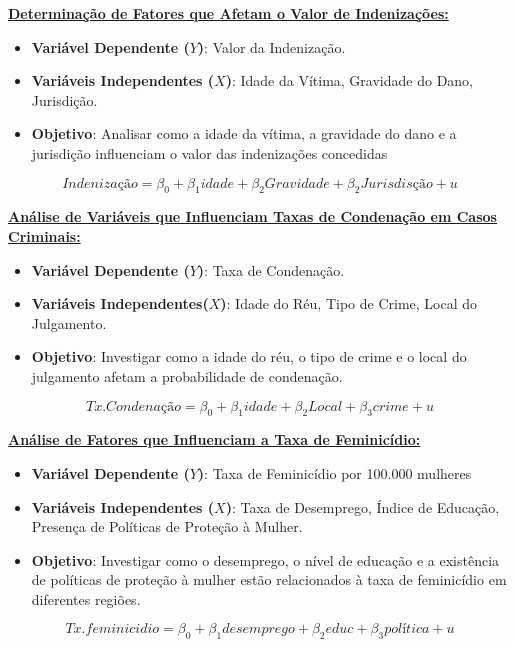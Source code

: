 \documentclass[
  letterpaper,
  DIV=11,
  numbers=noendperiod]{scrreprt}
\providecommand{\tightlist}{%
  \setlength{\itemsep}{0pt}\setlength{\parskip}{0pt}}
\begin{document}
\ul{\textbf{Determinação de Fatores que Afetam o Valor de
Indenizações:}}

\begin{itemize}
\tightlist
\item
  \textbf{Variável Dependente (\(Y\))}: Valor da Indenização.
\item
  \textbf{Variáveis Independentes (\(X\))}: Idade da Vítima, Gravidade
  do Dano, Jurisdição.
\item
  \textbf{Objetivo}: Analisar como a idade da vítima, a gravidade do
  dano e a jurisdição influenciam o valor das indenizações concedidas
\end{itemize}

\[Indenização = \beta_0 + \beta_1 idade+ \beta_2 Gravidade + \beta_2 Jurisdisção + u\]

\ul{\textbf{Análise de Variáveis que Influenciam Taxas de Condenação em
Casos Criminais:}}

\begin{itemize}
\tightlist
\item
  \textbf{Variável Dependente (\(Y\))}: Taxa de Condenação.
\item
  \textbf{Variáveis Independentes(\(X\))}: Idade do Réu, Tipo de Crime,
  Local do Julgamento.
\item
  \textbf{Objetivo}: Investigar como a idade do réu, o tipo de crime e o
  local do julgamento afetam a probabilidade de condenação.
\end{itemize}

\[Tx.Condenação = \beta_0 + \beta_1  idade  +  \beta_2 Local  + \beta_3  crime + u\]

\ul{\textbf{Análise de Fatores que Influenciam a Taxa de Feminicídio:}}

\begin{itemize}
\tightlist
\item
  \textbf{Variável Dependente (\(Y\))}: Taxa de Feminicídio por 100.000
  mulheres
\item
  \textbf{Variáveis Independentes (\(X\))}: Taxa de Desemprego, Índice
  de Educação, Presença de Políticas de Proteção à Mulher.
\item
  \textbf{Objetivo}: Investigar como o desemprego, o nível de educação e
  a existência de políticas de proteção à mulher estão relacionados à
  taxa de feminicídio em diferentes regiões.
\end{itemize}

\[Tx.feminicidio = \beta_0 + \beta_1 desemprego + \beta_2 educ + \beta_3 política + u \]
\end{document}
